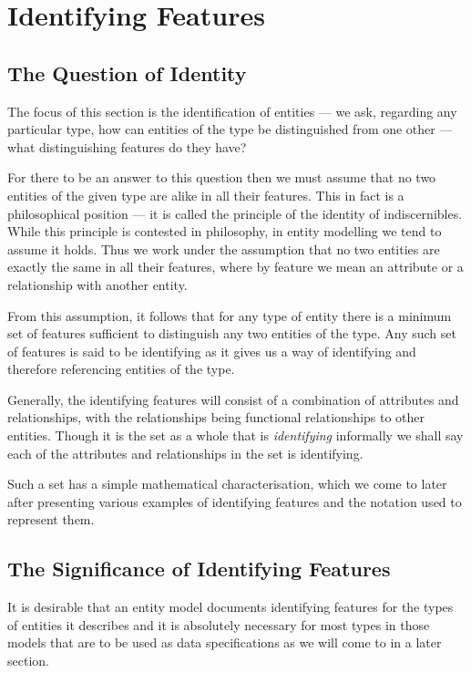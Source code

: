 \section{Identifying Features}
\label{IdentifyingFeatures}
\subsection{The Question of Identity}
\mynote
The focus of this section is the identification of entities ---  we ask, regarding any particular type, how can entities of the type be distinguished from one other 
--- what distinguishing features do they have? 

For there to be an answer to this question then we must assume that no two entities of the given type are alike in all their features. This in fact  is a philosophical position 
--- it is called the principle of the identity of indiscernibles. 
While this principle is contested in philosophy, in entity modelling we tend to assume it holds.
Thus we work under the assumption that no two entities are exactly the same in all their features, where by feature we mean an attribute or a relationship with another entity. 

From this assumption, it follows that for any type of entity there is a minimum set of features sufficient to distinguish any two entities of the type. Any such set of features is said to be identifying as it gives us a way of identifying and therefore referencing entities of the type. 

 Generally, 
 the identifying features will consist of a combination of attributes and relationships, 
 with the relationships being functional relationships to other entities. 
Though it is the set as a whole that is \textit{identifying} 
informally we shall say each of the attributes and relationships in the set is identifying. 

Such a set has a simple mathematical characterisation, which we come to later after presenting various
examples  of identifying features and the notation used to represent them.

\subsection{The Significance of Identifying Features}

\mynote 
It is desirable that an entity model documents identifying features for the types of entities it describes and  it is  absolutely necessary for most types in those models that are to be used as data specifications as we will come to in a later section. 

